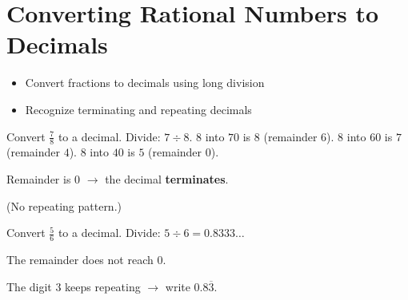 \section{Converting Rational Numbers to Decimals}

\begin{stepGoal}
\begin{itemize}
    \item Convert fractions to decimals using long division
    \item Recognize terminating and repeating decimals
\end{itemize}
\end{stepGoal}

\begin{stepVocabBox}
\end{stepVocabBox}

\begin{stepsCard}
\end{stepsCard}

\begin{stepExample}{Convert $\frac{7}{8}$ to a decimal.}
     Divide: $7 \div 8$.
    $8$ into $70$ is $8$ (remainder $6$). $8$ into $60$ is $7$ (remainder $4$). $8$ into $40$ is $5$ (remainder $0$).

     Remainder is $0$ $\to$ the decimal \textbf{terminates}.

     (No repeating pattern.)
\end{stepExample}

\begin{stepExample}{Convert $\frac{5}{6}$ to a decimal.}
     Divide: $5 \div 6 = 0.8333\ldots$

     The remainder does not reach $0$.

     The digit $3$ keeps repeating $\to$ write $0.8\overline{3}$.
\end{stepExample}

